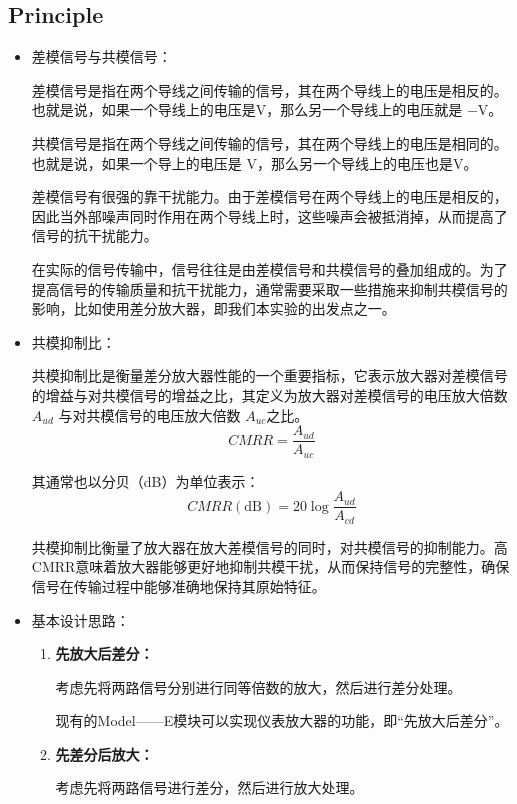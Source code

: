 \clearpage
\subsection{Principle}

	\begin{itemize}
		\item 差模信号与共模信号：

			差模信号是指在两个导线之间传输的信号，其在两个导线上的电压是相反的。也就是说，如果一个导线上的电压是V，那么另一个导线上的电压就是 −V。

			共模信号是指在两个导线之间传输的信号，其在两个导线上的电压是相同的。也就是说，如果一个导上的电压是 V，那么另一个导线上的电压也是V。

			差模信号有很强的靠干扰能力。由于差模信号在两个导线上的电压是相反的，因此当外部噪声同时作用在两个导线上时，这些噪声会被抵消掉，从而提高了信号的抗干扰能力。

			在实际的信号传输中，信号往往是由差模信号和共模信号的叠加组成的。为了提高信号的传输质量和抗干扰能力，通常需要采取一些措施来抑制共模信号的影响，比如使用差分放大器，即我们本实验的出发点之一。

		\item 共模抑制比：
			
			共模抑制比是衡量差分放大器性能的一个重要指标，它表示放大器对差模信号的增益与对共模信号的增益之比，其定义为放大器对差模信号的电压放大倍数 $A_{ud}$ 与对共模信号的电压放大倍数 $A_{uc}$之比。
			\[
				CMRR = \frac{A_{ud}}{A_{uc}}
			\]

			其通常也以分贝（dB）为单位表示：
			\[
				CMRR(\text{dB}) = 20 \log\frac{A_{ud}}{A_{cd}}
			\]

			共模抑制比衡量了放大器在放大差模信号的同时，对共模信号的抑制能力。高CMRR意味着放大器能够更好地抑制共模干扰，从而保持信号的完整性，确保信号在传输过程中能够准确地保持其原始特征。


		\item 基本设计思路：
			\begin{enumerate}
				\item \textbf{先放大后差分：}
				
					考虑先将两路信号分别进行同等倍数的放大，然后进行差分处理。

					现有的Model——E模块可以实现仪表放大器的功能，即“先放大后差分”。

					
				\item \textbf{先差分后放大：}
				
					考虑先将两路信号进行差分，然后进行放大处理。


\end{enumerate}
\end{itemize}
